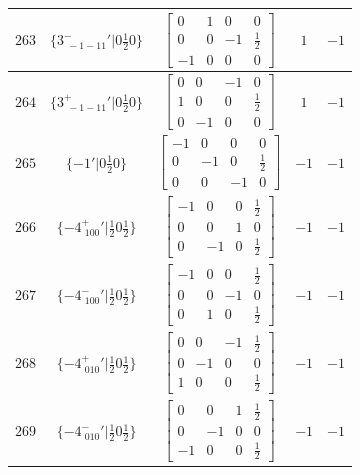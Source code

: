 \documentclass[fleqn,8pt]{jsarticle}
\begin{document}
\begin{longtable}{ccccc}
$ 263 $ & $ \{3^{-}_{\,\,-1-11}{}'|0 \frac{1}{2} 0\} $ & $ \begin{bmatrix} 0 & 1 & 0 & 0 \\ 0 & 0 & -1 & \frac{1}{2} \\ -1 & 0 & 0 & 0 \end{bmatrix} $ & $ 1 $ & $ -1 $ \\ \hline
$ 264 $ & $ \{3^{+}_{\,\,-1-11}{}'|0 \frac{1}{2} 0\} $ & $ \begin{bmatrix} 0 & 0 & -1 & 0 \\ 1 & 0 & 0 & \frac{1}{2} \\ 0 & -1 & 0 & 0 \end{bmatrix} $ & $ 1 $ & $ -1 $ \\ \hline
$ 265 $ & $ \{-1{}'|0 \frac{1}{2} 0\} $ & $ \begin{bmatrix} -1 & 0 & 0 & 0 \\ 0 & -1 & 0 & \frac{1}{2} \\ 0 & 0 & -1 & 0 \end{bmatrix} $ & $ -1 $ & $ -1 $ \\ \hline
$ 266 $ & $ \{-4^{+}_{\,\,100}{}'|\frac{1}{2} 0 \frac{1}{2}\} $ & $ \begin{bmatrix} -1 & 0 & 0 & \frac{1}{2} \\ 0 & 0 & 1 & 0 \\ 0 & -1 & 0 & \frac{1}{2} \end{bmatrix} $ & $ -1 $ & $ -1 $ \\ \hline
$ 267 $ & $ \{-4^{-}_{\,\,100}{}'|\frac{1}{2} 0 \frac{1}{2}\} $ & $ \begin{bmatrix} -1 & 0 & 0 & \frac{1}{2} \\ 0 & 0 & -1 & 0 \\ 0 & 1 & 0 & \frac{1}{2} \end{bmatrix} $ & $ -1 $ & $ -1 $ \\ \hline
$ 268 $ & $ \{-4^{+}_{\,\,010}{}'|\frac{1}{2} 0 \frac{1}{2}\} $ & $ \begin{bmatrix} 0 & 0 & -1 & \frac{1}{2} \\ 0 & -1 & 0 & 0 \\ 1 & 0 & 0 & \frac{1}{2} \end{bmatrix} $ & $ -1 $ & $ -1 $ \\ \hline
$ 269 $ & $ \{-4^{-}_{\,\,010}{}'|\frac{1}{2} 0 \frac{1}{2}\} $ & $ \begin{bmatrix} 0 & 0 & 1 & \frac{1}{2} \\ 0 & -1 & 0 & 0 \\ -1 & 0 & 0 & \frac{1}{2} \end{bmatrix} $ & $ -1 $ & $ -1 $ \\ \hline

\end{longtable}
\end{document}
